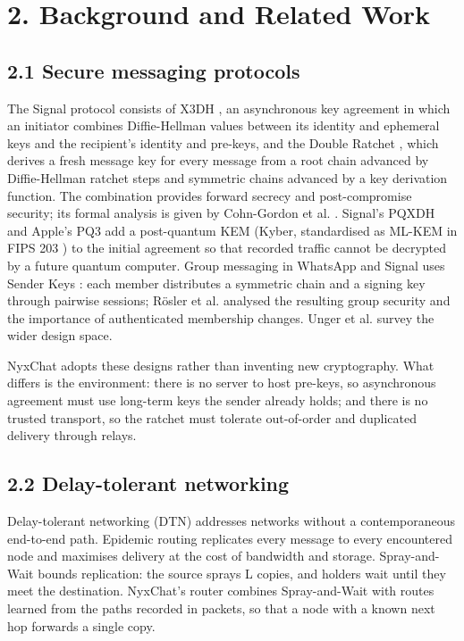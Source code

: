 \documentclass[conference]{IEEEtran}
\begin{document}
\section{2. Background and Related Work}
\subsection{2.1 Secure messaging protocols}
The Signal protocol consists of X3DH \cite{ref1}, an asynchronous key agreement in which an initiator combines Diffie-Hellman values between its identity and ephemeral keys and the recipient's identity and pre-keys, and the Double Ratchet \cite{ref2}, which derives a fresh message key for every message from a root chain advanced by Diffie-Hellman ratchet steps and symmetric chains advanced by a key derivation function. The combination provides forward secrecy and post-compromise security; its formal analysis is given by Cohn-Gordon et al. \cite{ref3}. Signal's PQXDH \cite{ref4} and Apple's PQ3 \cite{ref18} add a post-quantum KEM (Kyber, standardised as ML-KEM in FIPS 203 \cite{ref5}) to the initial agreement so that recorded traffic cannot be decrypted by a future quantum computer. Group messaging in WhatsApp and Signal uses Sender Keys \cite{ref13}: each member distributes a symmetric chain and a signing key through pairwise sessions; Rösler et al. \cite{ref14} analysed the resulting group security and the importance of authenticated membership changes. Unger et al. \cite{ref23} survey the wider design space.

NyxChat adopts these designs rather than inventing new cryptography. What differs is the environment: there is no server to host pre-keys, so asynchronous agreement must use long-term keys the sender already holds; and there is no trusted transport, so the ratchet must tolerate out-of-order and duplicated delivery through relays.

\subsection{2.2 Delay-tolerant networking}
Delay-tolerant networking (DTN) \cite{ref10} addresses networks without a contemporaneous end-to-end path. Epidemic routing \cite{ref9} replicates every message to every encountered node and maximises delivery at the cost of bandwidth and storage. Spray-and-Wait \cite{ref8} bounds replication: the source sprays L copies, and holders wait until they meet the destination. NyxChat's router combines Spray-and-Wait with routes learned from the paths recorded in packets, so that a node with a known next hop forwards a single copy.
\end{document}
